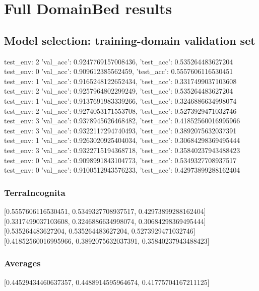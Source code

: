 \documentclass{article}
\begin{document}
\section{Full DomainBed results}

\subsection{Model selection: training-domain validation set}
test_env: 2
{'val_acc': 0.9247769157008436, 'test_acc': 0.535264483627204}
test_env: 0
{'val_acc': 0.909612385562459, 'test_acc': 0.5557606116530451}
test_env: 1
{'val_acc': 0.9165248122652434, 'test_acc': 0.3317499037103608}
test_env: 2
{'val_acc': 0.9257964802299249, 'test_acc': 0.535264483627204}
test_env: 1
{'val_acc': 0.9137691983339266, 'test_acc': 0.3246886634998074}
test_env: 2
{'val_acc': 0.9274053171553708, 'test_acc': 0.5273929471032746}
test_env: 3
{'val_acc': 0.9378945626468482, 'test_acc': 0.41852560016995966}
test_env: 3
{'val_acc': 0.9322117294740493, 'test_acc': 0.3892075632037391}
test_env: 1
{'val_acc': 0.9263020925404034, 'test_acc': 0.30684298369495444}
test_env: 3
{'val_acc': 0.9322715194368718, 'test_acc': 0.35840237943488423}
test_env: 0
{'val_acc': 0.9098991843104773, 'test_acc': 0.5349327708937517}
test_env: 0
{'val_acc': 0.9100512943576233, 'test_acc': 0.42973899288162404}

\subsubsection{TerraIncognita}
[0.5557606116530451, 0.5349327708937517, 0.42973899288162404]
[0.3317499037103608, 0.3246886634998074, 0.30684298369495444]
[0.535264483627204, 0.535264483627204, 0.5273929471032746]
[0.41852560016995966, 0.3892075632037391, 0.35840237943488423]

\begin{center}
\end{center}

\subsubsection{Averages}
[0.44529434460637357, 0.4488914595964674, 0.41775704167211125]

\begin{center}
\end{center}
\end{document}
